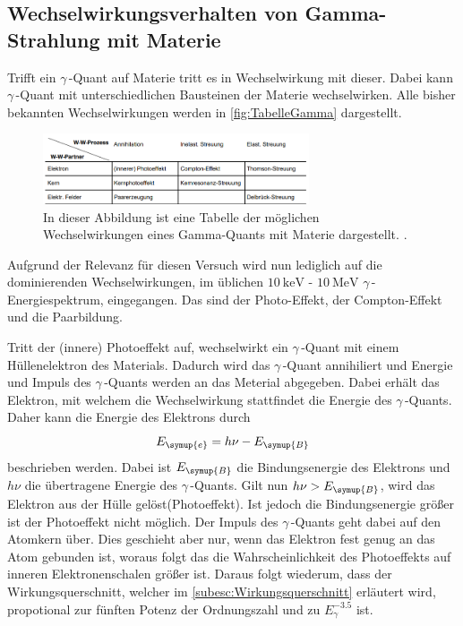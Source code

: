 \subsection{Wechselwirkungsverhalten von Gamma-Strahlung mit Materie}
\label{Gammawechselwirkung}
Trifft ein $\gamma$\,-Quant auf Materie tritt es in Wechselwirkung mit dieser. Dabei kann $\gamma$\,-Quant mit unterschiedlichen Bausteinen der Materie wechselwirken. 
Alle bisher bekannten Wechselwirkungen werden in \autoref{fig:TabelleGamma} dargestellt.

\begin{figure}
    \centering
    \includegraphics[width = 0.7\textwidth]{content/TabelleGamma.png}
    \caption{In dieser Abbildung ist eine Tabelle der möglichen Wechselwirkungen eines Gamma-Quants mit Materie dargestellt. \cite{v704}.}
    \label{fig:TabelleGamma}
\end{figure}

Aufgrund der Relevanz für diesen Versuch wird nun lediglich auf die dominierenden Wechselwirkungen, im üblichen $\qty{10}{\kilo\electronvolt}$ - $\qty{10}{\mega\electronvolt}$
$\gamma$\,-Energiespektrum, eingegangen. Das sind der Photo-Effekt, der Compton-Effekt und die Paarbildung.


Tritt der (innere) Photoeffekt auf, wechselwirkt ein $\gamma$\,-Quant mit einem Hüllenelektron des Materials. Dadurch wird das $\gamma$\,-Quant annihiliert und Energie und 
Impuls des $\gamma$\,-Quants werden an das Meterial abgegeben. Dabei erhält das Elektron, mit welchem die Wechselwirkung stattfindet die Energie des $\gamma$\,-Quants.
Daher kann die Energie des Elektrons durch 
\begin{equation*}
    E_{\symup{e}} = h\nu - E_{\symup{B}}
\end{equation*}
beschrieben werden. Dabei ist $E_{\symup{B}}$ die Bindungsenergie des Elektrons und $h\nu$ die übertragene Energie des $\gamma$\,-Quants. Gilt nun $h\nu > E_{\symup{B}}$, wird
das Elektron aus der Hülle gelöst(Photoeffekt). Ist jedoch die Bindungsenergie größer ist der Photoeffekt nicht möglich.  Der Impuls des $\gamma$\,-Quants geht dabei auf den 
Atomkern über. Dies geschieht aber nur, wenn das Elektron fest genug an das Atom gebunden ist, woraus folgt das die Wahrscheinlichkeit des Photoeffekts auf inneren 
Elektronenschalen größer ist. Daraus folgt wiederum, dass der Wirkungsquerschnitt, welcher im \autoref{subesc:Wirkungsquerschnitt} erläutert wird, propotional zur fünften 
Potenz der Ordnungszahl und zu $E_\gamma^{-3.5}$ ist.


